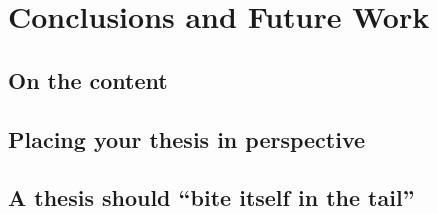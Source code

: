 \chapter{Conclusions and Future Work}
\label{chp:conclusions}
\section{On the content}


\section{Placing your thesis in perspective}

    
\section{A thesis should ``bite itself in the tail''}